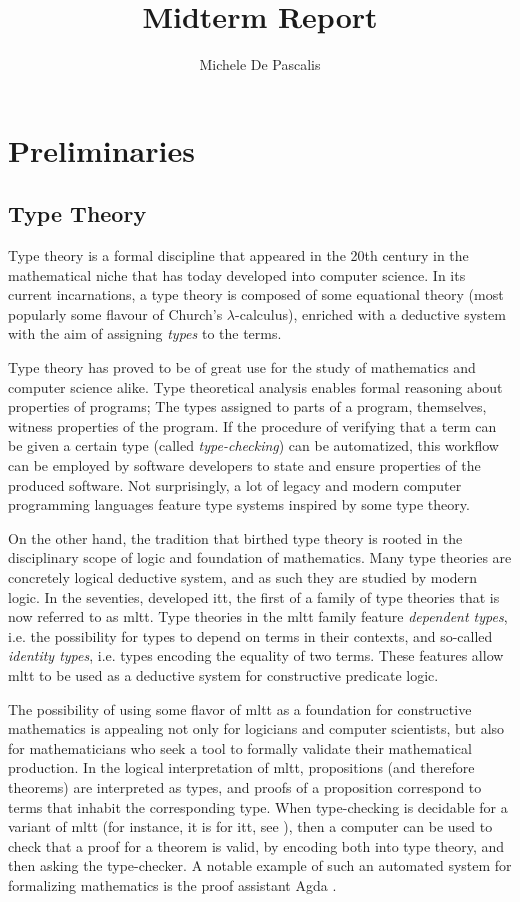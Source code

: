 \documentclass[a4paper]{article}
\author{Michele De Pascalis}
\title{Midterm Report}
\begin{document}
\maketitle

\section{Preliminaries}

\subsection{Type Theory}

Type theory is a formal discipline that appeared in the 20th century in the mathematical niche that has today developed into computer science. In its current incarnations, a type theory is composed of some equational theory (most popularly some flavour of Church's \(\lambda\)-calculus), enriched with a deductive system with the aim of assigning \textit{types} to the terms.

Type theory has proved to be of great use for the study of mathematics and computer science alike. Type theoretical analysis enables formal reasoning about properties of programs; The types assigned to parts of a program, themselves, witness properties of the program. If the procedure of verifying that a term can be given a certain type (called \textit{type-checking}) can be automatized, this workflow can be employed by software developers to state and ensure properties of the produced software. Not surprisingly, a lot of legacy and modern computer programming languages feature type systems inspired by some type theory.

On the other hand, the tradition that birthed type theory is rooted in the disciplinary scope of logic and foundation of mathematics. Many type theories are concretely logical deductive system, and as such they are studied by modern logic. In the seventies, \textcite{MartinLoef1998} developed \gls{itt}, the first of a family of type theories that is now referred to as \gls{mltt}. Type theories in the \gls{mltt} family feature \textit{dependent types}, i.e. the possibility for types to depend on terms in their contexts, and so-called \textit{identity types}, i.e. types encoding the equality of two terms. These features allow \gls{mltt} to be used as a deductive system for constructive predicate logic.

The possibility of using some flavor of \gls{mltt} as a foundation for constructive mathematics is appealing not only for logicians and computer scientists, but also for mathematicians who seek a tool to formally validate their mathematical production. In the logical interpretation of \gls{mltt}, propositions (and therefore theorems) are interpreted as types, and proofs of a proposition correspond to terms that inhabit the corresponding type. When type-checking is decidable for a variant of \gls{mltt} (for instance, it is for \gls{itt}, see \textcite{Hofmann1995}), then a computer can be used to check that a proof for a theorem is valid, by encoding both into type theory, and then asking the type-checker. A notable example of such an automated system for formalizing mathematics is the proof assistant Agda \cite{Norell2009}.
\end{document}
